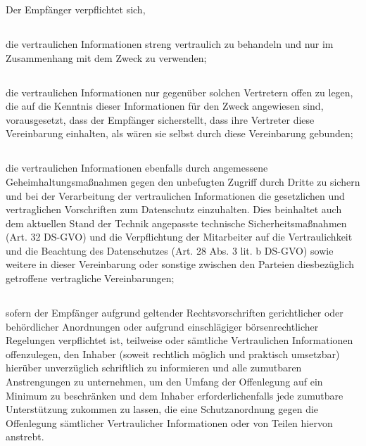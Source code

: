 \documentclass[10pt]{article}
\begin{document}
Der Empfänger verpflichtet sich,

\subsection{} die vertraulichen Informationen streng vertraulich zu behandeln und nur im Zusammenhang mit dem Zweck zu verwenden;

\subsection{} die vertraulichen Informationen nur gegenüber solchen Vertretern offen zu legen, die auf die Kenntnis dieser Informationen für den Zweck angewiesen sind, vorausgesetzt, dass der Empfänger sicherstellt, dass ihre Vertreter diese Vereinbarung einhalten, als wären sie selbst durch diese Vereinbarung gebunden;

\subsection{} die vertraulichen Informationen ebenfalls durch angemessene Geheimhaltungsmaßnahmen gegen den unbefugten Zugriff durch Dritte zu sichern und bei der Verarbeitung der vertraulichen Informationen die gesetzlichen und vertraglichen Vorschriften zum Datenschutz einzuhalten. Dies beinhaltet auch dem aktuellen Stand der Technik angepasste technische Sicherheitsmaßnahmen (Art. 32 DS-GVO) und die Verpflichtung der Mitarbeiter auf die Vertraulichkeit und die Beachtung des Datenschutzes (Art. 28 Abs. 3 lit. b DS-GVO) sowie weitere in dieser Vereinbarung oder sonstige zwischen den Parteien diesbezüglich getroffene vertragliche Vereinbarungen;

\subsection{} sofern der Empfänger aufgrund geltender Rechtsvorschriften gerichtlicher oder behördlicher Anordnungen oder aufgrund einschlägiger börsenrechtlicher Regelungen verpflichtet ist, teilweise oder sämtliche Vertraulichen Informationen offenzulegen, den Inhaber (soweit rechtlich möglich und praktisch umsetzbar) hierüber unverzüglich schriftlich zu informieren und alle zumutbaren Anstrengungen zu unternehmen, um den Umfang der Offenlegung auf ein Minimum zu beschränken und dem Inhaber erforderlichenfalls jede zumutbare Unterstützung zukommen zu lassen, die eine Schutzanordnung gegen die Offenlegung sämtlicher Vertraulicher Informationen oder von Teilen hiervon anstrebt.
\end{document}
